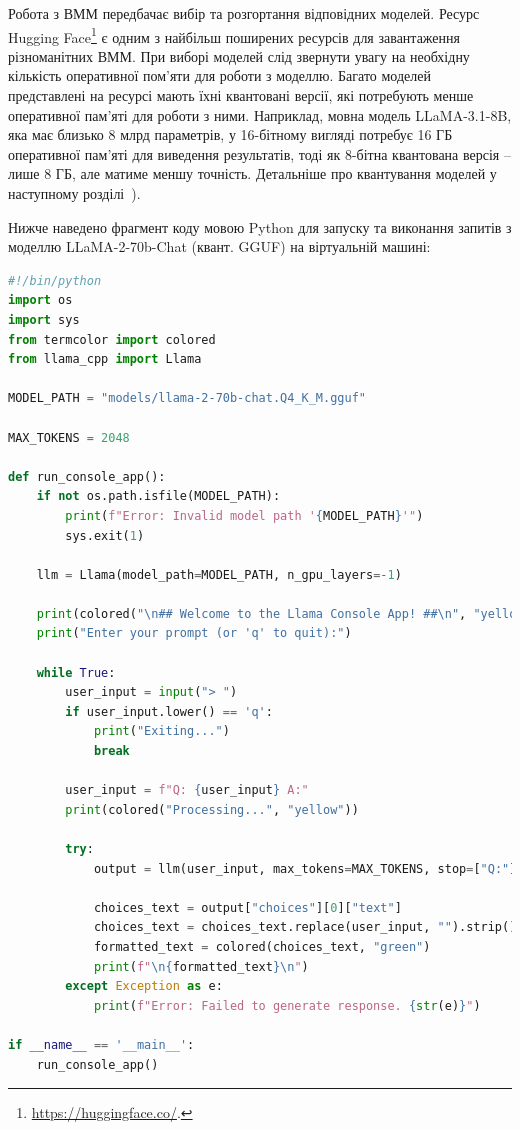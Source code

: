 Робота з ВММ передбачає вибір та розгортання відповідних моделей. Ресурс Hugging Face\footnote{\url{https://huggingface.co/}.} є одним з найбільш поширених ресурсів для завантаження різноманітних ВММ. При виборі моделей слід звернути увагу на необхідну кількість оперативної пом'яти для роботи з моделлю. Багато моделей представлені на ресурсі мають їхні квантовані версії, які потребують менше оперативної пам'яті для роботи з ними. Наприклад, мовна модель LLaMA-3.1-8B, яка має близько 8 млрд параметрів, у 16-бітному вигляді потребує 16 ГБ оперативної пам'яті для виведення результатів, тоді як 8-бітна квантована версія -- лише 8 ГБ, але матиме меншу точність. Детальніше про квантування моделей у наступному розділі~).

Нижче наведено фрагмент коду мовою Python для запуску та виконання запитів з моделлю LLaMA-2-70b-Chat (квант. GGUF) на віртуальній машині:
\begin{lstlisting}[language=python, breaklines=true]
#!/bin/python
import os
import sys
from termcolor import colored
from llama_cpp import Llama

MODEL_PATH = "models/llama-2-70b-chat.Q4_K_M.gguf"

MAX_TOKENS = 2048

def run_console_app():
    if not os.path.isfile(MODEL_PATH):
        print(f"Error: Invalid model path '{MODEL_PATH}'")
        sys.exit(1)

    llm = Llama(model_path=MODEL_PATH, n_gpu_layers=-1)

    print(colored("\n## Welcome to the Llama Console App! ##\n", "yellow"))
    print("Enter your prompt (or 'q' to quit):")

    while True:
        user_input = input("> ")
        if user_input.lower() == 'q':
            print("Exiting...")
            break

        user_input = f"Q: {user_input} A:"
        print(colored("Processing...", "yellow"))

        try:
            output = llm(user_input, max_tokens=MAX_TOKENS, stop=["Q:"], echo=True)

            choices_text = output["choices"][0]["text"]
            choices_text = choices_text.replace(user_input, "").strip()
            formatted_text = colored(choices_text, "green")
            print(f"\n{formatted_text}\n")
        except Exception as e:
            print(f"Error: Failed to generate response. {str(e)}")

if __name__ == '__main__':
    run_console_app()
\end{lstlisting}

